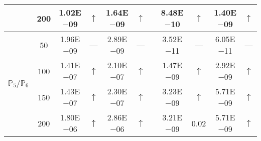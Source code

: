 \begin{table}[H]
{\begin{tabular}{@{}l c c c c c c c c c c@{}}
 & 200 & 1.02E$-$09 & $\uparrow$  & 1.64E$-$09 & $\uparrow$ &  & 8.48E$-$10 & $\uparrow$ & 1.40E$-$09 & $\uparrow$\\
\midrule
\multirow{4}{*}{$\mathbb{P}_{5}/\mathbb{P}_{6}$}
 & 50 & 1.96E$-$09 & ---  & 2.89E$-$09 & --- &  & 3.52E$-$11 & --- & 6.05E$-$11 & ---\\
 & 100 & 1.41E$-$07 & $\uparrow$  & 2.10E$-$07 & $\uparrow$ &  & 1.47E$-$09 & $\uparrow$ & 2.92E$-$09 & $\uparrow$\\
 & 150 & 1.43E$-$07 & $\uparrow$  & 2.30E$-$07 & $\uparrow$ &  & 3.23E$-$09 & $\uparrow$ & 5.71E$-$09 & $\uparrow$\\
 & 200 & 1.80E$-$06 & $\uparrow$  & 2.86E$-$06 & $\uparrow$ &  & 3.21E$-$09 & 0.02 & 5.71E$-$09 & $\uparrow$\\ 
\bottomrule
\end{tabular}}
\label{none}
\end{table}

